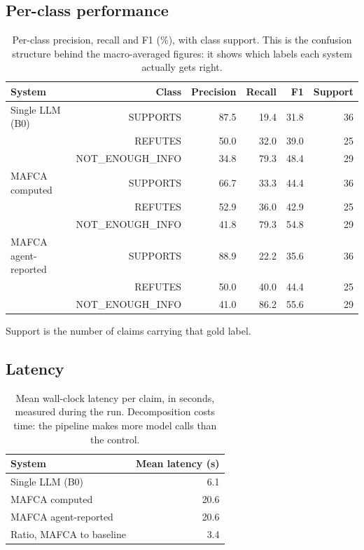 \documentclass[11pt,a4paper]{article}
\begin{document}
\subsection{Per-class performance}
\begin{table}[H]
\centering
\small
\caption{Per-class precision, recall and F1 (\%), with class support. This is the confusion structure behind the macro-averaged figures: it shows which labels each system actually gets right.}
\label{tab:per_class}
\begin{tabular}{@{}lrrrrr@{}}
\toprule
\textbf{System} & \textbf{Class} & \textbf{Precision} & \textbf{Recall} & \textbf{F1} & \textbf{Support} \\
\midrule
Single LLM (B0) & SUPPORTS & 87.5 & 19.4 & 31.8 & 36 \\
 & REFUTES & 50.0 & 32.0 & 39.0 & 25 \\
 & NOT\_ENOUGH\_INFO & 34.8 & 79.3 & 48.4 & 29 \\
MAFCA computed & SUPPORTS & 66.7 & 33.3 & 44.4 & 36 \\
 & REFUTES & 52.9 & 36.0 & 42.9 & 25 \\
 & NOT\_ENOUGH\_INFO & 41.8 & 79.3 & 54.8 & 29 \\
MAFCA agent-reported & SUPPORTS & 88.9 & 22.2 & 35.6 & 36 \\
 & REFUTES & 50.0 & 40.0 & 44.4 & 25 \\
 & NOT\_ENOUGH\_INFO & 41.0 & 86.2 & 55.6 & 29 \\
\bottomrule
\end{tabular}
\par\vspace{2pt}\footnotesize{Support is the number of claims carrying that gold label.}
\end{table}
\subsection{Latency}
\begin{table}[H]
\centering
\small
\caption{Mean wall-clock latency per claim, in seconds, measured during the run. Decomposition costs time: the pipeline makes more model calls than the control.}
\label{tab:cost}
\begin{tabular}{@{}lr@{}}
\toprule
\textbf{System} & \textbf{Mean latency (s)} \\
\midrule
Single LLM (B0) & 6.1 \\
MAFCA computed & 20.6 \\
MAFCA agent-reported & 20.6 \\
Ratio, MAFCA to baseline & 3.4 \\
\bottomrule
\end{tabular}
\end{table}
\end{document}
